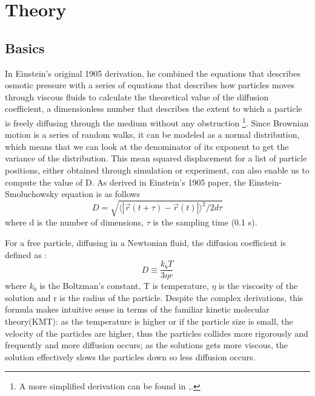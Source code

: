 \documentclass[iop,revtex4]{emulateapj_mod}
\begin{document}
\section{Theory}\label{sec:theory}
\subsection{Basics}
\par In Einstein's original 1905 derivation, he combined the equations that describes osmotic pressure with a series of equations that describes how particles moves through viscous fluids to calculate the theoretical value of the diffusion coefficient, a dimensionless number that describes the extent to which a particle is freely diffusing through the medium without any obstruction \citep{einstein_1905}\footnote{A more simplified derivation can be found in  \cite{newburgh},\cite{einstein_langevin}.}. Since Brownian motion is a series of random walks, it can be modeled as a normal distribution, which means that we can look at the denominator of its exponent to get the variance of the distribution\citep{math}. This mean squared displacement for a list of particle positions, either obtained through simulation or experiment, can also enable us to compute the value of D. As derived in Einstein's 1905 paper, the Einstein-Smoluchowsky equation is as follows
\begin{equation}
D = \sqrt{\langle |\vec{r}(t+\tau)-\vec{r}(t) |\rangle ^2 /2d\tau}
\label{exp}
\end{equation}
where d is the number of dimensions, $\tau$ is the sampling time (0.1 s).
\par For a free particle, diffusing in a Newtonian fluid, the diffusion coefficient is defined as : 
\begin{equation}
D \equiv \frac{k_bT}{3\eta r}
\label{theory}
\end{equation}
where $k_b$ is the Boltzman's constant, T is temperature, $\eta$ is the viscosity of the solution and r is the radius of the particle. Despite the complex derivations, this formula  makes intuitive sense in terms of the familiar kinetic molecular theory(KMT): as the temperature is higher or if the particle size is small, the velocity of the particles are higher, thus the particles collides more rigorously and frequently and more diffusion occurs;  as the solutions gets more viscous, the solution effectively slows the particles down so less diffusion occurs.
\end{document}
